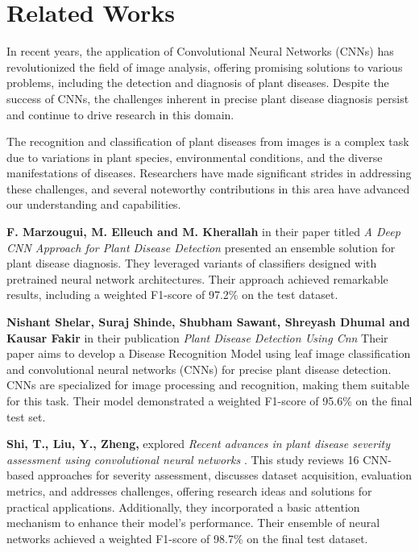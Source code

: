 \chapter{Related Works}

In recent years, the application of Convolutional Neural Networks (CNNs) has revolutionized the field of image analysis, 
offering promising solutions to various problems, including the detection and diagnosis of plant diseases. 
Despite the success of CNNs, the challenges inherent in precise plant disease diagnosis persist and continue to drive 
research in this domain.

The recognition and classification of plant diseases from images is a complex task due to variations in plant species, 
environmental conditions, and the diverse manifestations of diseases. Researchers have made significant strides in 
addressing these challenges, and several noteworthy contributions in this area have advanced our understanding and 
capabilities.

\textbf{F. Marzougui, M. Elleuch and M. Kherallah} in their paper titled 
\textit{A Deep CNN Approach for Plant Disease Detection} \cite{Marzougui} presented an ensemble solution for plant 
disease diagnosis. They leveraged variants of classifiers designed with pretrained neural network architectures. 
Their approach achieved remarkable results, including a weighted F1-score of 97.2\% on the test dataset. 

\textbf{Nishant Shelar, Suraj Shinde, Shubham Sawant, Shreyash Dhumal and Kausar Fakir} in their publication 
\textit{Plant Disease Detection Using Cnn} \cite{NishantShelar} Their paper aims to develop a Disease Recognition 
Model using leaf image classification and convolutional neural networks (CNNs) for precise plant disease detection. 
CNNs are specialized for image processing and recognition, making them suitable for this task. 
Their model demonstrated a weighted F1-score of 95.6\% on the final test set.

\textbf{Shi, T., Liu, Y., Zheng,} explored 
\textit{Recent advances in plant disease severity assessment using convolutional neural networks} \cite{Shi}.
This study reviews 16 CNN-based approaches for severity assessment, discusses dataset acquisition, evaluation metrics, 
and addresses challenges, offering research ideas and solutions for practical applications. Additionally, 
they incorporated a basic attention mechanism to enhance their model's performance. Their ensemble of neural 
networks achieved a weighted F1-score of 98.7\% on the final test dataset.

